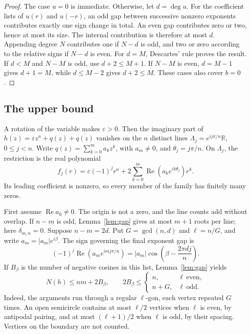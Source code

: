 \documentclass[a4paper]{amsart}
\theoremstyle{remark}
\newcommand{\R}{\mathbb R}
\newcommand{\eps}{\varepsilon}
\DeclareMathOperator{\Rea}{Re}
\begin{document}
\begin{proof}
The case \(u=0\) is immediate. Otherwise, let \(d=\deg u\).
For the coefficient lists of \(u(r)\) and \(u(-r)\),
an odd gap between successive nonzero exponents contributes
exactly one sign change in total. An even gap contributes
zero or two, hence at most its size.
The internal contribution is therefore at most \(d\).
Appending degree \(N\) contributes one if \(N-d\) is odd,
and two or zero according to the relative signs if \(N-d\)
is even. For \(d=M\), Descartes' rule proves the result.
If \(d<M\) and \(N-M\) is odd, use \(d+2\le M+1\).
If \(N-M\) is even, \(d=M-1\) gives \(d+1=M\),
while \(d\le M-2\) gives \(d+2\le M\).
These cases also cover \(b=0\).
\end{proof}

\subsection{The upper bound}
A rotation of the variable makes \(\eps>0\).
Then the imaginary part of
\(h(z)=\eps z^n+q(z)+\overline{q(z)}\)
vanishes on the \(n\) distinct lines
\(\Lambda_j=e^{ij\pi/n}\R\), \(0\le j<n\).
Write \(q(z)=\sum_{k=0}^m a_kz^k\), with \(a_m\ne0\),
and \(\theta_j=j\pi/n\). On \(\Lambda_j\),
the restriction is the real polynomial
\begin{equation}\label{eq:restriction}
 f_j(r)=\eps(-1)^j r^n+
             2\sum_{k=0}^m\Rea(a_ke^{ik\theta_j})r^k.
\end{equation}
Its leading coefficient is nonzero, so every member of
the family has finitely many zeros.

First assume \(\Rea a_0\ne0\). The origin is not a zero,
and the line counts add without overlap.
If \(n-m\) is odd, Lemma~\ref{lem:gap} gives at most
\(m+1\) roots per line; here \(\delta_{m,n}=0\).
Suppose \(n-m=2d\). Put \(G=\gcd(n,d)\) and
\(\ell=n/G\), and write \(a_m=|a_m|e^{i\beta}\).
The sign governing the final exponent gap is
\[
 (-1)^j\Rea(a_me^{imj\pi/n})
       =|a_m|\cos\left(\beta-\frac{2\pi dj}{n}\right).
\]
If \(B_\beta\) is the number of negative cosines in this
list, Lemma~\ref{lem:gap} yields
\begin{equation}\label{eq:angularbound}
 N(h)\le nm+2B_\beta,\qquad
 2B_\beta\le
 \begin{cases}
 n,&\ell\ \text{even},\\
 n+G,&\ell\ \text{odd}.
 \end{cases}
\end{equation}
Indeed, the arguments run through a regular \(\ell\)-gon,
each vertex repeated \(G\) times. An open semicircle
contains at most \(\ell/2\) vertices when \(\ell\) is
even, by antipodal pairing, and at most
\((\ell+1)/2\) when \(\ell\) is odd, by their spacing.
Vertices on the boundary are not counted.
\end{document}
